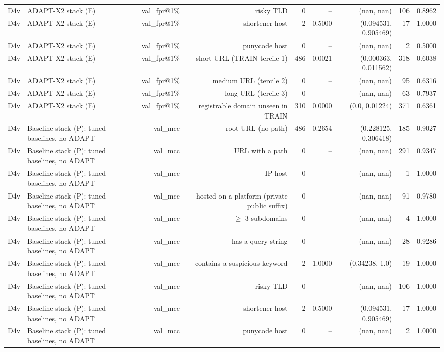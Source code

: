 \begin{table}[t]
\begin{tabular}{llrrrrrrr}
D4v & ADAPT-X2 stack (E) & val\_fpr@1\% & risky TLD & 0 & -- & (nan, nan) & 106 & 0.8962 \\
D4v & ADAPT-X2 stack (E) & val\_fpr@1\% & shortener host & 2 & 0.5000 & (0.094531, 0.905469) & 17 & 1.0000 \\
D4v & ADAPT-X2 stack (E) & val\_fpr@1\% & punycode host & 0 & -- & (nan, nan) & 2 & 0.5000 \\
D4v & ADAPT-X2 stack (E) & val\_fpr@1\% & short URL (TRAIN tercile 1) & 486 & 0.0021 & (0.000363, 0.011562) & 318 & 0.6038 \\
D4v & ADAPT-X2 stack (E) & val\_fpr@1\% & medium URL (tercile 2) & 0 & -- & (nan, nan) & 95 & 0.6316 \\
D4v & ADAPT-X2 stack (E) & val\_fpr@1\% & long URL (tercile 3) & 0 & -- & (nan, nan) & 63 & 0.7937 \\
D4v & ADAPT-X2 stack (E) & val\_fpr@1\% & registrable domain unseen in TRAIN & 310 & 0.0000 & (0.0, 0.01224) & 371 & 0.6361 \\
D4v & Baseline stack (P): tuned baselines, no ADAPT & val\_mcc & root URL (no path) & 486 & 0.2654 & (0.228125, 0.306418) & 185 & 0.9027 \\
D4v & Baseline stack (P): tuned baselines, no ADAPT & val\_mcc & URL with a path & 0 & -- & (nan, nan) & 291 & 0.9347 \\
D4v & Baseline stack (P): tuned baselines, no ADAPT & val\_mcc & IP host & 0 & -- & (nan, nan) & 1 & 1.0000 \\
D4v & Baseline stack (P): tuned baselines, no ADAPT & val\_mcc & hosted on a platform (private public suffix) & 0 & -- & (nan, nan) & 91 & 0.9780 \\
D4v & Baseline stack (P): tuned baselines, no ADAPT & val\_mcc & $\geq$ 3 subdomains & 0 & -- & (nan, nan) & 4 & 1.0000 \\
D4v & Baseline stack (P): tuned baselines, no ADAPT & val\_mcc & has a query string & 0 & -- & (nan, nan) & 28 & 0.9286 \\
D4v & Baseline stack (P): tuned baselines, no ADAPT & val\_mcc & contains a suspicious keyword & 2 & 1.0000 & (0.34238, 1.0) & 19 & 1.0000 \\
D4v & Baseline stack (P): tuned baselines, no ADAPT & val\_mcc & risky TLD & 0 & -- & (nan, nan) & 106 & 1.0000 \\
D4v & Baseline stack (P): tuned baselines, no ADAPT & val\_mcc & shortener host & 2 & 0.5000 & (0.094531, 0.905469) & 17 & 1.0000 \\
D4v & Baseline stack (P): tuned baselines, no ADAPT & val\_mcc & punycode host & 0 & -- & (nan, nan) & 2 & 1.0000 \\

\end{tabular}
\end{table}
